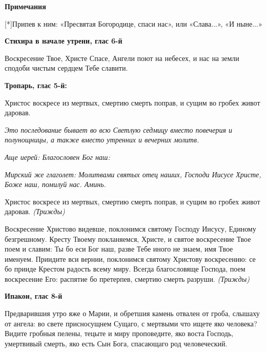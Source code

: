 \bfseries Примечания\normalfont{}


[*]Припев к ним: «Пресвятая Богородице, спаси нас», или «Слава...», «И ныне...»


\mychapterending







\bfseries Стихира в начале утрени, глас 6-й\normalfont{}


Воскресение Твое, Христе Спасе, Ангели поют на небесех, и нас на земли сподоби чистым сердцем Тебе славити.





\bfseries Тропарь, глас 5-й:\normalfont{}


Христос воскресе из мертвых, смертию смерть поправ, и сущим во гробех живот даровав.





\mychapterending




\itshape Это последование бывает во всю Светлую седмицу вместо повечерия и полунощницы, а также вместо утренних и вечерних молитв.\normalfont{}


\itshape Аще иерей:\normalfont{} Благословен Бог наш:


\itshape Мирский же глаголет:\normalfont{} Молитвами святых отец наших, Господи Иисусе Христе, Боже наш, помилуй нас. Аминь.


Христос воскресе из мертвых, смертию смерть поправ, и сущим во гробех живот даровав. \itshape (Трижды)\normalfont{}


Воскресение Христово видевше, поклонимся святому Господу Иисусу, Единому безгрешному. Кресту Твоему покланяемся, Христе, и святое воскресение Твое поем и славим: Ты бо еси Бог наш, разве Тебе иного не знаем, имя Твое именуем. Приидите вси вернии, поклонимся святому Христову воскресению: се бо прииде Крестом радость всему миру. Всегда благословяще Господа, поем воскресение Его: распятие бо претерпев, смертию смерть разруши. \itshape (Трижды)\normalfont{}





\bfseries Ипакои, глас 8-й\normalfont{}


Предварившия утро яже о Марии, и обретшия камень отвален от гроба, слышаху от ангела: во свете присносущнем Сущаго, с мертвыми что ищете яко человека? Видите гробныя пелены, тецыте и миру проповедите, яко воста Господь, умертвивый смерть, яко есть Сын Бога, спасающаго род человеческий.






